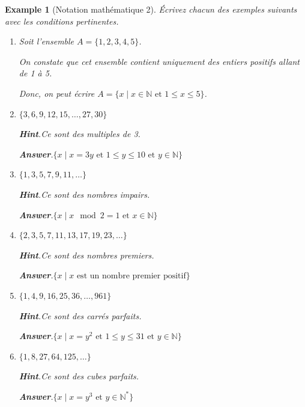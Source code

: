 \documentclass{sn-jnl}
\theoremstyle{thmstyleone}%
\theoremstyle{thmstyletwo}%
\newtheorem{example}[theorem]{Example}
\theoremstyle{thmstylethree}%
\newcommand{\blocktitlefont}{\relax}
\numberwithin{equation}{section}
\begin{document}
\begin{example}[Notation mathématique 2]\label{example-structured-with-task}%
%
Écrivez chacun des exemples suivants avec les conditions pertinentes.%
\begin{enumerate}[font=\bfseries,label=(\alph*),ref=\alph*]%
\item{}Soit l'ensemble \(A=\lbrace 1,2,3,4,5\rbrace\).%
\par
On constate que cet ensemble contient uniquement des entiers positifs allant de 1 à 5.%
\par
Donc, on peut écrire \(A=\lbrace x\mid x\in\mathbb{N}\text{ et } 1\leq x\leq 5\rbrace\).%
\item{}\(\{3,6,9,12,15,\ldots,27,30\}\)%
\par\smallskip%
\noindent\textbf{\blocktitlefont Hint}.\hypertarget{example-structured-with-task-5-2}{}\quad{}Ce sont des multiples de 3.%
\par\smallskip%
\noindent\textbf{\blocktitlefont Answer}.\hypertarget{example-structured-with-task-5-3}{}\quad{}\(\{x\mid x=3y \text{ et } 1\leq y\leq 10 \text{ et } y\in\mathbb{N}\}\)%
\item{}\(\{1,3,5,7,9,11,\ldots\}\)%
\par\smallskip%
\noindent\textbf{\blocktitlefont Hint}.\hypertarget{example-structured-with-task-6-2}{}\quad{}Ce sont des nombres impairs.%
\par\smallskip%
\noindent\textbf{\blocktitlefont Answer}.\hypertarget{example-structured-with-task-6-3}{}\quad{}\(\{x\mid x\mod 2=1 \text{ et } x\in\mathbb{N}\}\)%
\item{}\(\{2,3,5,7,11,13,17,19,23,\ldots\}\)%
\par\smallskip%
\noindent\textbf{\blocktitlefont Hint}.\hypertarget{example-structured-with-task-7-2}{}\quad{}Ce sont des nombres premiers.%
\par\smallskip%
\noindent\textbf{\blocktitlefont Answer}.\hypertarget{example-structured-with-task-7-3}{}\quad{}\(\{x\mid x\text{ est un nombre premier positif}\}\)%
\item{}\(\{1,4,9,16,25,36,\ldots,961\}\)%
\par\smallskip%
\noindent\textbf{\blocktitlefont Hint}.\hypertarget{example-structured-with-task-8-2}{}\quad{}Ce sont des carrés parfaits.%
\par\smallskip%
\noindent\textbf{\blocktitlefont Answer}.\hypertarget{example-structured-with-task-8-3}{}\quad{}\(\{x\mid x=y^2 \text{ et } 1\leq y\leq 31\text{ et } y\in\mathbb{N}\}\)%
\item{}\(\{1,8,27,64,125,\ldots\}\)%
\par\smallskip%
\noindent\textbf{\blocktitlefont Hint}.\hypertarget{example-structured-with-task-9-2}{}\quad{}Ce sont des cubes parfaits.%
\par\smallskip%
\noindent\textbf{\blocktitlefont Answer}.\hypertarget{example-structured-with-task-9-3}{}\quad{}\(\{x\mid x=y^3 \text{ et } y\in\mathbb{N^*}\}\)%
\end{enumerate}%
\end{example}
\end{document}
